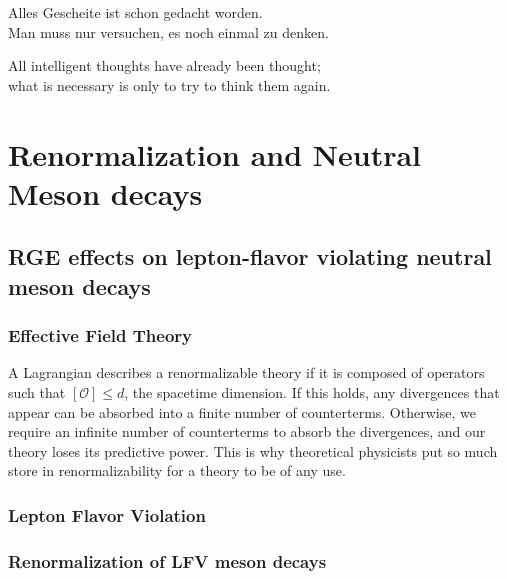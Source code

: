  \begin{savequote}[8cm]                                
  Alles Gescheite ist schon gedacht worden.\\                                                       Man muss nur versuchen, es noch einmal zu denken.                                  
  
  All intelligent thoughts have already been thought;\\                                             what is necessary is only to try to think them again.                   
  \end{savequote}                                
                                  
  \chapter{\label{ch:2-meson-decay}Renormalization and Neutral Meson decays}                          
                                                      
  \minitoc                                            
                                  
  \section{RGE effects on lepton-flavor violating neutral meson decays}  
  
  \subsection{Effective Field Theory}
  
  A Lagrangian describes a renormalizable theory if it is composed of operators such that $[\mathcal{O}] \leq d$, the spacetime
dimension. If this holds, any divergences that appear can be absorbed into
a finite number of counterterms. Otherwise, we require an infinite number of counterterms to absorb the divergences, and our theory loses its
predictive power. This is why theoretical physicists put so much store in
renormalizability for a theory to be of any use.

  \subsection{Lepton Flavor Violation}

    \subsection{Renormalization of LFV meson decays}
  
  
  
  

  
